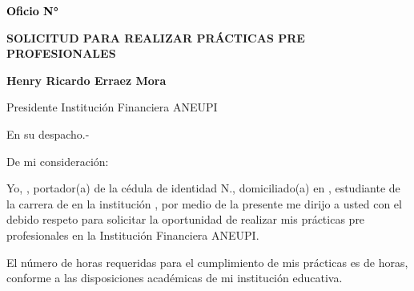 \documentclass[a4paper,12pt]{article}
\begin{document}
\pagestyle{empty}

\vspace*{-4.5cm}
\noindent
\hfill
{\footnotesize \textcolor{black}{\textbf{Oficio N° }}}

\vspace{2.5cm}
\noindent
\hspace*{\dimexpr\textwidth+1cm\relax}

\begin{center}
    \textbf{\large SOLICITUD PARA REALIZAR PRÁCTICAS PRE PROFESIONALES}
\end{center}

\vspace{0.8cm}

\noindent \textbf{Henry Ricardo Erraez Mora} 

\noindent Presidente Institución Financiera ANEUPI 

\noindent En su despacho.-

\vspace{1cm}

\noindent De mi consideración:

\noindent Yo, \textbf{\underline{\hspace{6cm}}}, portador(a) de la cédula de identidad N.\textbf{\underline{\hspace{4cm}}}, domiciliado(a) en \textbf{\underline{\hspace{8cm}}}, estudiante de la carrera de \textbf{\underline{\hspace{6cm}}} en la institución \textbf{\underline{\hspace{7cm}}}, por medio de la presente me dirijo a usted con el debido respeto para solicitar la oportunidad de realizar mis prácticas pre profesionales en la Institución Financiera ANEUPI.

\vspace{0.5cm}

\noindent El número de horas requeridas para el cumplimiento de mis prácticas es de \textbf{\underline{\hspace{1.2cm}}} horas, conforme a las disposiciones académicas de mi institución educativa.

\vspace{0.5cm}
\end{document}
